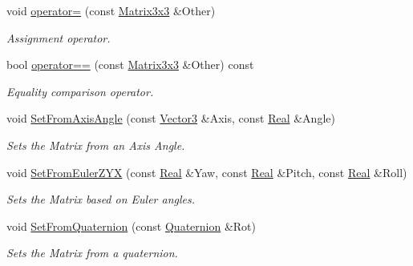\begin{DoxyCompactItemize}
void \hyperlink{classMezzanine_1_1Matrix3x3_a1325c8acafaa237d6513f247140c3c0f}{operator=} (const \hyperlink{classMezzanine_1_1Matrix3x3}{Matrix3x3} \&Other)
\begin{DoxyCompactList}\small\item\em Assignment operator. \item\end{DoxyCompactList}\item 
bool \hyperlink{classMezzanine_1_1Matrix3x3_a19fdf1613b63951511d33e0894baa68b}{operator==} (const \hyperlink{classMezzanine_1_1Matrix3x3}{Matrix3x3} \&Other) const 
\begin{DoxyCompactList}\small\item\em Equality comparison operator. \item\end{DoxyCompactList}\item 
void \hyperlink{classMezzanine_1_1Matrix3x3_a1adcb69e002d04577eb07e2fed86203d}{SetFromAxisAngle} (const \hyperlink{classMezzanine_1_1Vector3}{Vector3} \&Axis, const \hyperlink{namespaceMezzanine_a726731b1a7df72bf3583e4a97282c6f6}{Real} \&Angle)
\begin{DoxyCompactList}\small\item\em Sets the Matrix from an Axis Angle. \item\end{DoxyCompactList}\item 
void \hyperlink{classMezzanine_1_1Matrix3x3_ac3acce8bb84714f41c337eea678ad037}{SetFromEulerZYX} (const \hyperlink{namespaceMezzanine_a726731b1a7df72bf3583e4a97282c6f6}{Real} \&Yaw, const \hyperlink{namespaceMezzanine_a726731b1a7df72bf3583e4a97282c6f6}{Real} \&Pitch, const \hyperlink{namespaceMezzanine_a726731b1a7df72bf3583e4a97282c6f6}{Real} \&Roll)
\begin{DoxyCompactList}\small\item\em Sets the Matrix based on Euler angles. \item\end{DoxyCompactList}\item 
void \hyperlink{classMezzanine_1_1Matrix3x3_a55cdd8644e7091fbd6e89bfab36d6533}{SetFromQuaternion} (const \hyperlink{classMezzanine_1_1Quaternion}{Quaternion} \&Rot)
\begin{DoxyCompactList}\small\item\em Sets the Matrix from a quaternion. \item\end{DoxyCompactList}\item 

\end{DoxyCompactItemize}

